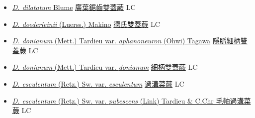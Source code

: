 \begin{itemize}
\begin{itemize}
        \item[] \href{http://www.theplantlist.org/tpl1.1/search?q=Diplazium+dilatatum}{\textit{D. dilatatum} Blume}   \href{\detokenize{http://taibnet.sinica.edu.tw/chi/taibnet_species_list.php?T2=廣葉鋸齒雙蓋蕨&T2_new_value=true&fr=y}}{廣葉鋸齒雙蓋蕨} LC
        \item[] \href{http://www.theplantlist.org/tpl1.1/search?q=Diplazium+doederleinii}{\textit{D. doederleinii} (Luerss.) Makino}   \href{\detokenize{http://taibnet.sinica.edu.tw/chi/taibnet_species_list.php?T2=德氏雙蓋蕨&T2_new_value=true&fr=y}}{德氏雙蓋蕨} LC
        \item[] \href{http://www.theplantlist.org/tpl1.1/search?q=Diplazium+donianum+var.+aphanoneuron}{\textit{D. donianum} (Mett.) Tardieu var. \textit{aphanoneuron} (Ohwi) Tagawa}   \href{\detokenize{http://taibnet.sinica.edu.tw/chi/taibnet_species_list.php?T2=隱脈細柄雙蓋蕨&T2_new_value=true&fr=y}}{隱脈細柄雙蓋蕨} LC
        \item[] \href{http://www.theplantlist.org/tpl1.1/search?q=Diplazium+donianum+var.+donianum}{\textit{D. donianum} (Mett.) Tardieu var. \textit{donianum}}   \href{\detokenize{http://taibnet.sinica.edu.tw/chi/taibnet_species_list.php?T2=細柄雙蓋蕨&T2_new_value=true&fr=y}}{細柄雙蓋蕨} LC
        \item[] \href{http://www.theplantlist.org/tpl1.1/search?q=Diplazium+esculentum+var.+esculentum}{\textit{D. esculentum} (Retz.) Sw. var. \textit{esculentum}}   \href{\detokenize{http://taibnet.sinica.edu.tw/chi/taibnet_species_list.php?T2=過溝菜蕨&T2_new_value=true&fr=y}}{過溝菜蕨} LC
        \item[] \href{http://www.theplantlist.org/tpl1.1/search?q=Diplazium+esculentum+var.+pubescens}{\textit{D. esculentum} (Retz.) Sw. var. \textit{pubescens} (Link) Tardieu \& C.Chr }   \href{\detokenize{http://taibnet.sinica.edu.tw/chi/taibnet_species_list.php?T2=毛軸過溝菜蕨&T2_new_value=true&fr=y}}{毛軸過溝菜蕨} LC

\end{itemize}
\end{itemize}

